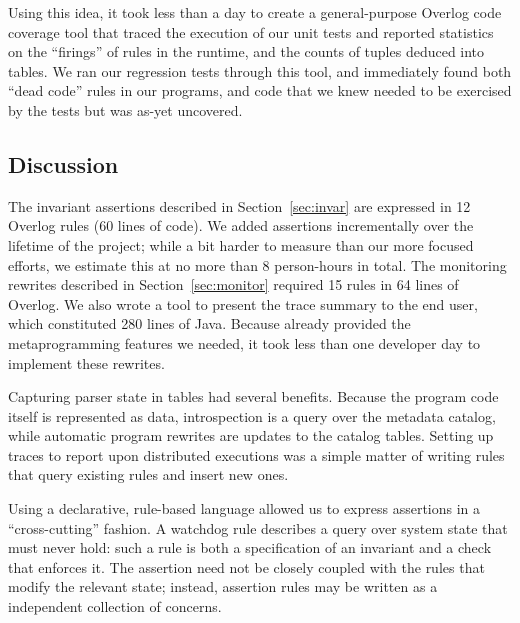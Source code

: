 Using this idea, it took less than a day to create a general-purpose Overlog
code coverage tool that traced the execution of our unit tests and reported
statistics on the ``firings'' of rules in the \JOL runtime, and the counts of
tuples deduced into tables. We ran our regression tests through this tool, and
immediately found both ``dead code'' rules in our programs, and code that we
knew needed to be exercised by the tests but was as-yet uncovered.

\subsection{Discussion}
The invariant assertions described in Section~\ref{sec:invar} are expressed in
12 Overlog rules (60 lines of code).  We added assertions incrementally over the
lifetime of the project; while a bit harder to measure than our more focused
efforts, we estimate this at no more than 8 person-hours in total.  The
monitoring rewrites described in Section~\ref{sec:monitor} required 15 rules in
64 lines of Overlog. We also wrote a tool to present the trace summary to the
end user, which constituted 280 lines of Java. Because \JOL already provided the
metaprogramming features we needed, it took less than one developer day to
implement these rewrites.

Capturing parser state in tables had several benefits.  Because the program code
itself is represented as data, introspection is a query over the metadata catalog,
while automatic program rewrites are updates to the catalog tables.  Setting up
traces to report upon distributed executions was a simple matter of writing
rules that query existing rules and insert new ones.

Using a declarative, rule-based language allowed us to express assertions in a
``cross-cutting'' fashion.  A watchdog rule describes a query over system state
that must never hold: such a rule is both a specification of an invariant and a
check that enforces it.  The assertion need not be closely coupled with the
rules that modify the relevant state; instead, assertion rules may be written as
a independent collection of concerns.
